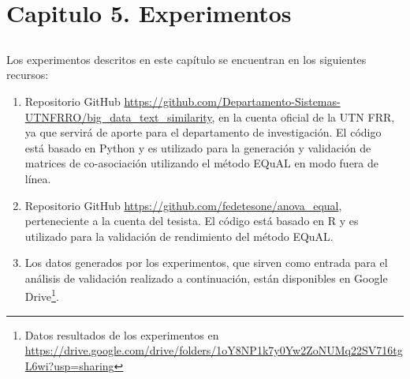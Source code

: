 \chapter*{Capitulo 5. \textbf{Experimentos}}\label{ch:experimentos}

\section*{}
\addtocounter{section}{1}
\setcounter{subsection}{0}

Los experimentos descritos en este capítulo se encuentran en los siguientes recursos:
\begin{enumerate}
	\item Repositorio GitHub \url{https://github.com/Departamento-Sistemas-UTNFRRO/big_data_text_similarity}, en la cuenta oficial de la UTN FRR, ya que servirá de aporte para el departamento de investigación. El código está basado en Python y es utilizado para la generación y validación de matrices de co-asociación utilizando el método EQuAL en modo fuera de línea.
	\item Repositorio GitHub \url{https://github.com/fedetesone/anova_equal}, perteneciente a la cuenta del tesista. El código está basado en R y es utilizado para la validación de rendimiento del método EQuAL.
	\item Los datos generados por los experimentos, que sirven como entrada para el análisis de validación realizado a continuación, están disponibles en Google Drive\footnote{Datos resultados de los experimentos en \url{https://drive.google.com/drive/folders/1oY8NP1k7y0Yw2ZoNUMq22SV716tgL6wi?usp=sharing}}.
\end{enumerate}






